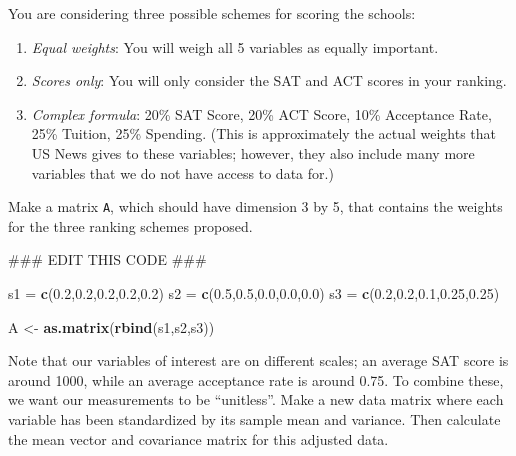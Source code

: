 \documentclass[]{article}
\newenvironment{Shaded}{\begin{snugshade}}{\end{snugshade}}
\newcommand{\KeywordTok}[1]{\textcolor[rgb]{0.13,0.29,0.53}{\textbf{#1}}}
\newcommand{\FloatTok}[1]{\textcolor[rgb]{0.00,0.00,0.81}{#1}}
\newcommand{\StringTok}[1]{\textcolor[rgb]{0.31,0.60,0.02}{#1}}
\newcommand{\AlertTok}[1]{\textcolor[rgb]{0.94,0.16,0.16}{#1}}
\newcommand{\NormalTok}[1]{#1}
\providecommand{\tightlist}{%
  \setlength{\itemsep}{0pt}\setlength{\parskip}{0pt}}
\begin{document}
You are considering three possible schemes for scoring the schools:

\begin{enumerate}
\def\labelenumi{\arabic{enumi}.}
\tightlist
\item
  \emph{Equal weights}: You will weigh all 5 variables as equally
  important.
\item
  \emph{Scores only}: You will only consider the SAT and ACT scores in
  your ranking.
\item
  \emph{Complex formula}: 20\% SAT Score, 20\% ACT Score, 10\%
  Acceptance Rate, 25\% Tuition, 25\% Spending. (This is approximately
  the actual weights that US News gives to these variables; however,
  they also include many more variables that we do not have access to
  data for.)
\end{enumerate}

Make a matrix \texttt{A}, which should have dimension 3 by 5, that
contains the weights for the three ranking schemes proposed.

\begin{Shaded}
\begin{Highlighting}[]
\NormalTok{###  EDIT THIS CODE }\AlertTok{###}

\NormalTok{s1 =}\StringTok{ }\KeywordTok{c}\NormalTok{(}\FloatTok{0.2}\NormalTok{,}\FloatTok{0.2}\NormalTok{,}\FloatTok{0.2}\NormalTok{,}\FloatTok{0.2}\NormalTok{,}\FloatTok{0.2}\NormalTok{)}
\NormalTok{s2 =}\StringTok{ }\KeywordTok{c}\NormalTok{(}\FloatTok{0.5}\NormalTok{,}\FloatTok{0.5}\NormalTok{,}\FloatTok{0.0}\NormalTok{,}\FloatTok{0.0}\NormalTok{,}\FloatTok{0.0}\NormalTok{)}
\NormalTok{s3 =}\StringTok{ }\KeywordTok{c}\NormalTok{(}\FloatTok{0.2}\NormalTok{,}\FloatTok{0.2}\NormalTok{,}\FloatTok{0.1}\NormalTok{,}\FloatTok{0.25}\NormalTok{,}\FloatTok{0.25}\NormalTok{)}

\NormalTok{A <-}\StringTok{ }\KeywordTok{as.matrix}\NormalTok{(}\KeywordTok{rbind}\NormalTok{(s1,s2,s3))}
\end{Highlighting}
\end{Shaded}

Note that our variables of interest are on different scales; an average
SAT score is around 1000, while an average acceptance rate is around
0.75. To combine these, we want our measurements to be ``unitless''.
Make a new data matrix where each variable has been standardized by its
sample mean and variance. Then calculate the mean vector and covariance
matrix for this adjusted data.
\end{document}
